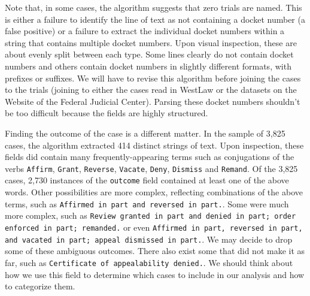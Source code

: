 \documentclass[11pt]{paper}
\begin{document}
\noindent Note that, in some cases, the algorithm suggests that 
zero trials are named. 
This is either a failure to identify the line of text as not containing 
a docket number (a false positive) or a failure to extract the individual 
docket numbers within a string that contains multiple docket numbers. 
Upon visual inspection, these are about evenly split between each type.
Some lines clearly do not contain docket numbers
and others contain docket numbers in slightly different formats, with prefixes or suffixes. 
We will have to revise this algorithm before joining the cases to the trials
(joining to either the cases read in WestLaw 
or the datasets on the Website of the Federal Judicial Center). 
Parsing these docket numbers shouldn't be too difficult 
because the fields are highly structured. 

Finding the outcome of the case is a different matter. 
In the sample of 3,825 cases, the algorithm extracted 414 distinct strings of text. 
Upon inspection, these fields did contain many frequently-appearing terms
such as conjugations of the verbs 
\texttt{Affirm}, 
\texttt{Grant}, 
\texttt{Reverse},
\texttt{Vacate}, 
\texttt{Deny},
\texttt{Dismiss}  and 
\texttt{Remand}.
Of the 3,825 cases, 2,730 instances of the \texttt{outcome} field
contained at least one of the above words. 
Other possibilities are more complex, 
reflecting combinations of the above terms,
such as \texttt{Affirmed in part and reversed in part.}.
Some were much more complex, such as 
\texttt{Review granted in part and denied in part; order enforced in part; remanded.} or even
\texttt{Affirmed in part, reversed in part, and vacated in part; appeal dismissed in part.}. 
We may decide to drop some of these ambiguous outcomes. 
There also exist some that did not make it as far, 
such as \texttt{Certificate of appealability denied.}.
We should think about how we use this field to determine which cases to 
include in our analysis and how to categorize them. 
\end{document}
